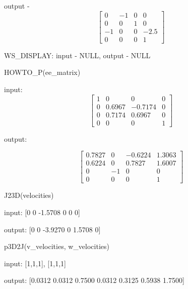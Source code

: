 \documentclass[12pt]{article}
\begin{document}
output -
\[\left[
\begin{array}{cccc}
0 & -1 & 0 & 0 \\
0 & 0 & 1 & 0 \\
-1 & 0 & 0 & -2.5\\
0 & 0 & 0 & 1
\end{array} \right]\]
         			
WS\_DISPLAY:
	input - NULL, output - NULL
	
HOWTO\_P(ee\_matrix)

input: 
\[\left[
\begin{array}{cccc}
1 & 0 & 0 & 0 \\
0 & 0.6967 & -0.7174 & 0 \\
0 & 0.7174 & 0.6967 & 0\\
0 & 0 & 0 & 1
\end{array} \right]\]       
 
 output:       
 
 \[\left[
\begin{array}{cccc}
0.7827  & 0 & -0.6224  & 1.3063 \\
0.6224  & 0 & 0.7827 & 1.6007 \\
0 & -1 & 0 & 0\\
0 & 0 & 0 & 1
\end{array} \right]\]

J23D(velocities)

input: [0         0   -1.5708         0         0         0]

output: [0         0   -3.9270         0    1.5708         0]

\medskip

p3D2J(v\_velocities, w\_velocities)

input: [1,1,1], [1,1,1]

output: [0.0312    0.0312    0.7500    0.0312    0.3125    0.5938    1.7500]
\end{document}
